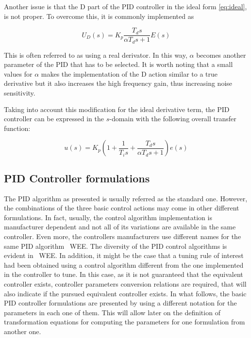 Another issue is that the D part of the PID controller in the ideal form \eqref{eq:ideal},  is not proper. To overcome this, it is commonly implemented as

\[U_D(s)= K_p\frac{T_ds}{\alpha T_d s+1} E(s)\]

This is often referred to as using a real derivator. In this way, $\alpha$ becomes another parameter of the PID that has to be selected. It is worth noting that a small values for $\alpha$ makes the implementation of the D action similar to a true derivative but it also increases the high frequency gain, thus increasing noise sensitivity.

Taking into account this modification for the ideal derivative term, the PID controller can be expressed in the $s$-domain with the following overall transfer function:

\begin{equation}
u(s)=K_p \left ( 1+\frac{1}{T_is}+\frac{T_ds}{\alpha T_d s+1} \right )  e(s)
\end{equation}

\subsection{PID Controller formulations}
\label{sec:3.1}
The PID algorithm as presented is usually referred as the standard one. However, the combinations of the three basic control actions may come in other different formulations. In fact, usually, the control algorithm implementation is manufacturer dependent and not all of its variations are available in the same controller. Even more, the controllers manufacturers use different names for the same PID algorithm~\cite{gerry1987} WEE.  The diversity of the PID control algorithms is evident in~\cite{odwyer2006} WEE.  In addition, it might be the case that a tuning rule of interest had been obtained using a control algorithm different from the one implemented in the controller to tune. In this case, as it is not guaranteed that the equivalent controller exists, controller parameters conversion relations are required, that will also indicate if the pursued equivalent controller exists. In what follows, the basic PID controller formulations are presented by using a different notation for the parameters in each one of them. This will allow later on the definition of transformation equations for computing the parameters for one formulation from another one.

